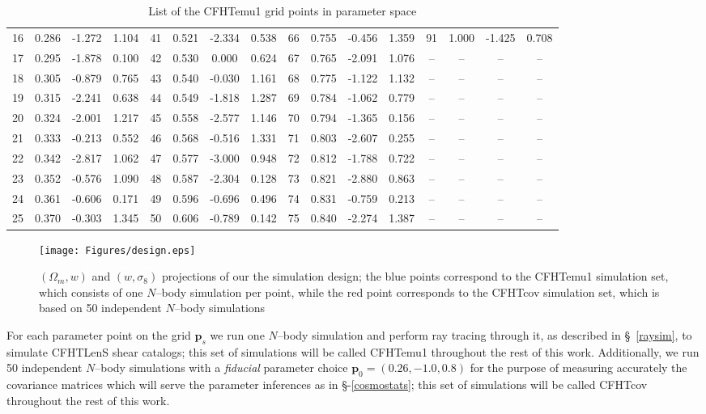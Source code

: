\documentclass[reprint,aps,prd,superscriptaddress,showkeys,showpacs]{revtex4-1}
\begin{document}
\begin{table*}
\begin{tabular}{c|ccc||c|ccc||c|ccc||c|ccc}
16 & 0.286 & -1.272 & 1.104 & 41 & 0.521 & -2.334 & 0.538 & 66 & 0.755 & -0.456 & 1.359 & 91 & 1.000 & -1.425 & 0.708 \\
17 & 0.295 & -1.878 & 0.100 & 42 & 0.530 & 0.000 & 0.624 & 67 & 0.765 & -2.091 & 1.076 & -- & -- & -- & -- \\
18 & 0.305 & -0.879 & 0.765 & 43 & 0.540 & -0.030 & 1.161 & 68 & 0.775 & -1.122 & 1.132 & -- & -- & -- & -- \\
19 & 0.315 & -2.241 & 0.638 & 44 & 0.549 & -1.818 & 1.287 & 69 & 0.784 & -1.062 & 0.779 & -- & -- & -- & -- \\
20 & 0.324 & -2.001 & 1.217 & 45 & 0.558 & -2.577 & 1.146 & 70 & 0.794 & -1.365 & 0.156 & -- & -- & -- & -- \\
21 & 0.333 & -0.213 & 0.552 & 46 & 0.568 & -0.516 & 1.331 & 71 & 0.803 & -2.607 & 0.255 & -- & -- & -- & -- \\
22 & 0.342 & -2.817 & 1.062 & 47 & 0.577 & -3.000 & 0.948 & 72 & 0.812 & -1.788 & 0.722 & -- & -- & -- & -- \\
23 & 0.352 & -0.576 & 1.090 & 48 & 0.587 & -2.304 & 0.128 & 73 & 0.821 & -2.880 & 0.863 & -- & -- & -- & -- \\
24 & 0.361 & -0.606 & 0.171 & 49 & 0.596 & -0.696 & 0.496 & 74 & 0.831 & -0.759 & 0.213 & -- & -- & -- & -- \\
25 & 0.370 & -0.303 & 1.345 & 50 & 0.606 & -0.789 & 0.142 & 75 & 0.840 & -2.274 & 1.387 & -- & -- & -- & -- \\
\end{tabular}
\caption{List of the CFHTemu1 grid points in parameter space}
\label{designtable}
\end{table*}
%
\begin{figure*}
\begin{center}
\texttt{[image: Figures/design.eps]}
\caption{$(\Omega_m,w)$ and $(w,\sigma_8)$ projections of our the simulation design; the blue points correspond to the CFHTemu1 simulation set, which consists of one $N$--body simulation per point, while the red point corresponds to the CFHTcov simulation set, which is based on 50 independent $N$--body simulations}
\label{designfig}
\end{center}
\end{figure*}
%
For each parameter point on the grid $\mathbf{p}_s$ we run one $N$--body simulation and perform ray tracing through it, as described in \S~\ref{raysim}, to simulate CFHTLenS shear catalogs; this set of simulations will be called CFHTemu1 throughout the rest of this work. Additionally, we run 50 independent $N$--body simulations with a \textit{fiducial} parameter choice $\mathbf{p}_0=(0.26,-1.0,0.8)$ for the purpose of measuring accurately the covariance matrices which will serve the parameter inferences as in \S-\ref{cosmostats}; this set of simulations will be called CFHTcov throughout the rest of this work.    
\end{document}

